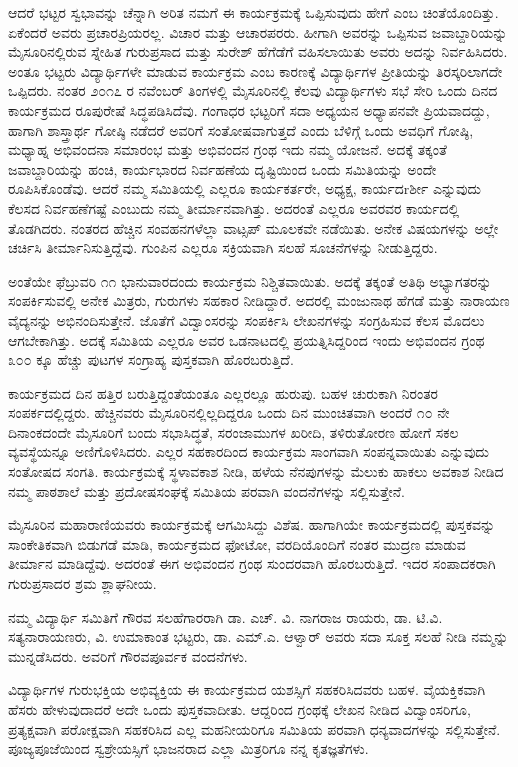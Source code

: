 ಆದರೆ ಭಟ್ಟರ ಸ್ವಭಾವನ್ನು ಚೆನ್ನಾಗಿ ಅರಿತ ನಮಗೆ ಈ ಕಾರ್ಯಕ್ರಮಕ್ಕೆ ಒಪ್ಪಿಸುವುದು ಹೇಗೆ ಎಂಬ ಚಿಂತೆಯೊಂದಿತ್ತು. ಏಕೆಂದರೆ ಅವರು ಪ್ರಚಾರಪ್ರಿಯರಲ್ಲ. ವಿಚಾರ ಮತ್ತು ಆಚಾರಪರರು. ಹೀಗಾಗಿ ಅವರನ್ನು ಒಪ್ಪಿಸುವ ಜವಾಬ್ದಾರಿಯನ್ನು ಮೈಸೂರಿನಲ್ಲಿರುವ ಸ್ನೇಹಿತ ಗುರುಪ್ರಸಾದ ಮತ್ತು ಸುರೇಶ್ ಹೆಗೆಡೆಗೆ ವಹಿಸಲಾಯಿತು ಅವರು ಅದನ್ನು ನಿರ್ವಹಿಸಿದರು. ಅಂತೂ ಭಟ್ಟರು ವಿದ್ಯಾರ್ಥಿಗಳೇ ಮಾಡುವ ಕಾರ್ಯಕ್ರಮ ಎಂಬ ಕಾರಣಕ್ಕೆ ವಿದ್ಯಾರ್ಥಿಗಳ ಪ್ರೀತಿಯನ್ನು ತಿರಸ್ಕರಿಲಾಗದೇ ಒಪ್ಪಿದರು. ನಂತರ ೨೦೧೭ ರ ನವೆಂಬರ್ ತಿಂಗಳಲ್ಲಿ ಮೈಸೂರಿನಲ್ಲಿ ಕೆಲವು ವಿದ್ಯಾರ್ಥಿಗಳು ಸಭೆ ಸೇರಿ ಒಂದು ದಿನದ ಕಾರ್ಯಕ್ರಮದ ರೂಪುರೇಷೆ ಸಿದ್ಧಪಡಿಸಿದೆವು. ಗಂಗಾಧರ ಭಟ್ಟರಿಗೆ ಸದಾ ಅಧ್ಯಯನ ಅಧ್ಯಾಪನವೇ ಪ್ರಿಯವಾದದ್ದು, ಹಾಗಾಗಿ ಶಾಸ್ತ್ರಾರ್ಥ ಗೋಷ್ಠಿ ನಡೆದರೆ ಅವರಿಗೆ ಸಂತೋಷವಾಗುತ್ತದೆ ಎಂದು ಬೆಳಿಗ್ಗೆ ಒಂದು ಅವಧಿಗೆ ಗೋಷ್ಠಿ, ಮಧ್ಯಾಹ್ನ ಅಭಿವಂದನಾ ಸಮಾರಂಭ ಮತ್ತು ಅಭಿವಂದನ ಗ್ರಂಥ ಇದು ನಮ್ಮ ಯೋಜನೆ. ಅದಕ್ಕೆ ತಕ್ಕಂತೆ ಜವಾಬ್ದಾರಿಯನ್ನು ಹಂಚಿ, ಕಾರ್ಯಭಾರದ ನಿರ್ವಹಣೆಯ ದೃಷ್ಟಿಯಿಂದ ಒಂದು ಸಮಿತಿಯನ್ನು ಅಂದೇ ರೂಪಿಸಿಕೊಂಡೆವು. ಆದರೆ ನಮ್ಮ ಸಮಿತಿಯಲ್ಲಿ ಎಲ್ಲರೂ ಕಾರ್ಯಕರ್ತರೇ, ಅಧ್ಯಕ್ಷ, ಕಾರ್ಯದrರ್ಶೀ ಎನ್ನುವುದು ಕೆಲಸದ ನಿರ್ವಹಣೆಗಷ್ಟೆ ಎಂಬುದು ನಮ್ಮ ತೀರ್ಮಾನವಾಗಿತ್ತು. ಅದರಂತೆ ಎಲ್ಲರೂ ಅವರವರ ಕಾರ್ಯದಲ್ಲಿ ತೊಡಗಿದರು. ನಂತರದ ಹೆಚ್ಚಿನ ಸಂವಹನಗಳೆಲ್ಲಾ ವಾಟ್ಸಪ್ ಮೂಲಕವೇ ನಡೆಯಿತು. ಅನೇಕ ವಿಷಯಗಳನ್ನು ಅಲ್ಲೇ ಚರ್ಚಿಸಿ ತೀರ್ಮಾನಿಸುತ್ತಿದ್ದೆವು. ಗುಂಪಿನ ಎಲ್ಲರೂ ಸಕ್ರಿಯವಾಗಿ ಸಲಹೆ ಸೂಚನೆಗಳನ್ನು ನೀಡುತ್ತಿದ್ದರು.

ಅಂತೆಯೇ ಫೆಬ್ರುವರಿ ೧೧ ಭಾನುವಾರದಂದು ಕಾರ್ಯಕ್ರಮ ನಿಶ್ಚಿತವಾಯಿತು. ಅದಕ್ಕೆ ತಕ್ಕಂತೆ ಅತಿಥಿ ಅಭ್ಯಾಗತರನ್ನು ಸಂಪರ್ಕಿಸುವಲ್ಲಿ ಅನೇಕ ಮಿತ್ರರು, ಗುರುಗಳು ಸಹಕಾರ ನೀಡಿದ್ದಾರೆ. ಅದರಲ್ಲಿ ಮಂಜುನಾಥ ಹೆಗಡೆ ಮತ್ತು ನಾರಾಯಣ ವೈದ್ಯನನ್ನು ಅಭಿನಂದಿಸುತ್ತೇನೆ. ಜೊತೆಗೆ ವಿದ್ವಾಂಸರನ್ನು ಸಂಪರ್ಕಿಸಿ ಲೇಖನಗಳನ್ನು ಸಂಗ್ರಹಿಸುವ ಕೆಲಸ ಮೊದಲು ಆಗಬೇಕಾಗಿತ್ತು. ಅದಕ್ಕೆ ಸಮಿತಿಯ ಎಲ್ಲರೂ ಅವರ ಒಡನಾಟದಲ್ಲಿ ಪ್ರಯತ್ನಿಸಿದ್ದರಿಂದ ಇಂದು ಅಭಿವಂದನ ಗ್ರಂಥ ೩೦೦ ಕ್ಕೂ ಹೆಚ್ಚು ಪುಟಗಳ ಸಂಗ್ರಾಹ್ಯ ಪುಸ್ತಕವಾಗಿ ಹೊರಬರುತ್ತಿದೆ.

ಕಾರ್ಯಕ್ರಮದ ದಿನ ಹತ್ತಿರ ಬರುತ್ತಿದ್ದಂತೆಯಂತೂ ಎಲ್ಲರಲ್ಲೂ ಹುರುಪು. ಬಹಳ ಚುರುಕಾಗಿ ನಿರಂತರ ಸಂಪರ್ಕದಲ್ಲಿದ್ದರು. ಹೆಚ್ಚಿನವರು ಮೈಸೂರಿನಲ್ಲಿಲ್ಲದಿದ್ದರೂ ಒಂದು ದಿನ ಮುಂಚಿತವಾಗಿ ಅಂದರೆ ೧೦ ನೇ ದಿನಾಂಕದಂದೇ ಮೈಸೂರಿಗೆ ಬಂದು ಸಭಾಸಿದ್ಧತೆ, ಸರಂಜಾಮುಗಳ ಖರೀದಿ, ತಳಿರುತೋರಣ ಹೋಗೆ ಸಕಲ ವ್ಯವಸ್ಥೆಯನ್ನೂ ಅಣಿಗೊಳಿಸಿದರು. ಎಲ್ಲರ ಸಹಕಾರದಿಂದ ಕಾರ್ಯಕ್ರಮ ಸಾಂಗವಾಗಿ ಸಂಪನ್ನವಾಯಿತು ಎನ್ನುವುದು ಸಂತೋಷದ ಸಂಗತಿ. ಕಾರ್ಯಕ್ರಮಕ್ಕೆ ಸ್ಥಳಾವಕಾಶ ನೀಡಿ, ಹಳೆಯ ನೆನಪುಗಳನ್ನು ಮೆಲುಕು ಹಾಕಲು ಅವಕಾಶ ನೀಡಿದ ನಮ್ಮ ಪಾಠಶಾಲೆ ಮತ್ತು ಪ್ರದೋಷಸಂಘಕ್ಕೆ ಸಮಿತಿಯ ಪರವಾಗಿ ವಂದನೆಗಳನ್ನು ಸಲ್ಲಿಸುತ್ತೇನೆ.

ಮೈಸೂರಿನ ಮಹಾರಾಣಿಯವರು ಕಾರ್ಯಕ್ರಮಕ್ಕೆ ಆಗಮಿಸಿದ್ದು ವಿಶೆಷ. ಹಾಗಾಗಿಯೇ ಕಾರ್ಯಕ್ರಮದಲ್ಲಿ ಪುಸ್ತಕವನ್ನು ಸಾಂಕೇತಿಕವಾಗಿ ಬಿಡುಗಡೆ ಮಾಡಿ, ಕಾರ್ಯಕ್ರಮದ ಫೋಟೋ, ವರದಿಯೊಂದಿಗೆ ನಂತರ ಮುದ್ರಣ ಮಾಡುವ ತೀರ್ಮಾನ ಮಾಡಿದ್ದೆವು. ಅದರಂತೆ ಈಗ ಅಭಿವಂದನ ಗ್ರಂಥ ಸುಂದರವಾಗಿ ಹೊರಬರುತ್ತಿದೆ. ಇದರ ಸಂಪಾದಕರಾಗಿ ಗುರುಪ್ರಸಾದರ ಶ್ರಮ ಶ್ಲಾಘನೀಯ.

ನಮ್ಮ ವಿದ್ಯಾರ್ಥಿ ಸಮಿತಿಗೆ ಗೌರವ ಸಲಹೆಗಾರರಾಗಿ ಡಾ. ಎಚ್. ವಿ. ನಾಗರಾಜ ರಾಯರು, ಡಾ. ಟಿ.ವಿ. ಸತ್ಯನಾರಾಯಣರು, ವಿ. ಉಮಾಕಾಂತ ಭಟ್ಟರು, ಡಾ. ಎಮ್.ಎ. ಆಳ್ವಾರ್ ಅವರು ಸದಾ ಸೂಕ್ತ ಸಲಹೆ ನೀಡಿ ನಮ್ಮನ್ನು ಮುನ್ನಡೆಸಿದರು. ಅವರಿಗೆ ಗೌರವಪೂರ್ವಕ ವಂದನೆಗಳು.

ವಿದ್ಯಾರ್ಥಿಗಳ ಗುರುಭಕ್ತಿಯ ಅಭಿವ್ಯಕ್ತಿಯ ಈ ಕಾರ್ಯಕ್ರಮದ ಯಶಸ್ಸಿಗೆ ಸಹಕರಿಸಿದವರು ಬಹಳ. ವೈಯಕ್ತಿಕವಾಗಿ ಹೆಸರು ಹೇಳುವುದಾದರೆ ಅದೇ ಒಂದು ಪುಸ್ತಕವಾದೀತು. ಆದ್ದರಿಂದ ಗ್ರಂಥಕ್ಕೆ ಲೇಖನ ನೀಡಿದ ವಿದ್ವಾಂಸರಿಗೂ, ಪ್ರತ್ಯಕ್ಷವಾಗಿ ಪರೋಕ್ಷವಾಗಿ ಸಹಕರಿಸಿದ ಎಲ್ಲ ಮಹನೀಯರಿಗೂ ಸಮಿತಿಯ ಪರವಾಗಿ ಧನ್ಯವಾದಗಳನ್ನು ಸಲ್ಲಿಸುತ್ತೇನೆ. ಪೂಜ್ಯಪೂಜೆಯಿಂದ ಸ್ವಶ್ರೇಯಸ್ಸಿಗೆ ಭಾಜನರಾದ ಎಲ್ಲಾ ಮಿತ್ರರಿಗೂ ನನ್ನ ಕೃತಜ್ಞತೆಗಳು.
